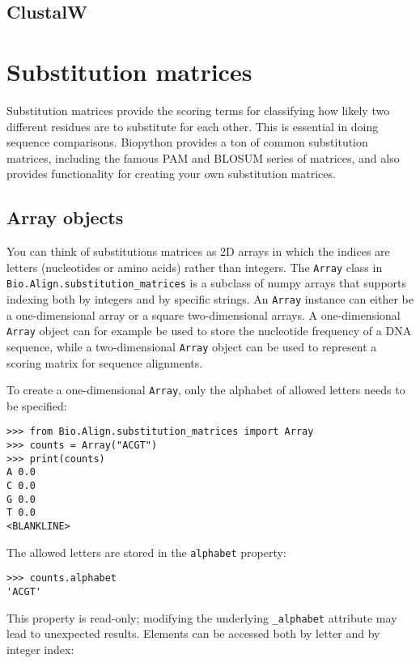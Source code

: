 \subsection{ClustalW}
\label{subsec:align_clustal}

\section{Substitution matrices}
\label{sec:substitution_matrices}

Substitution matrices \cite{durbin1998} provide the scoring terms for classifying how likely two different residues are to substitute for each other. This is essential in doing sequence comparisons.  Biopython provides a ton of common substitution matrices, including the famous PAM and BLOSUM series of matrices, and also provides functionality for creating your own substitution matrices.

\subsection{Array objects}

You can think of substitutions matrices as 2D arrays in which the indices are letters (nucleotides or amino acids) rather than integers.  The \verb+Array+ class in \verb+Bio.Align.substitution_matrices+ is a subclass of numpy arrays that supports indexing both by integers and by specific strings. An \verb+Array+ instance can either be a one-dimensional array or a square two-dimensional arrays. A one-dimensional \verb+Array+ object can for example be used to store the nucleotide frequency of a DNA sequence, while a two-dimensional \verb+Array+ object can be used to represent a scoring matrix for sequence alignments.

To create a one-dimensional \verb+Array+, only the alphabet of allowed letters needs to be specified:

\begin{verbatim}
>>> from Bio.Align.substitution_matrices import Array
>>> counts = Array("ACGT")
>>> print(counts)
A 0.0
C 0.0
G 0.0
T 0.0
<BLANKLINE>
\end{verbatim}
The allowed letters are stored in the \verb+alphabet+ property:

\begin{verbatim}
>>> counts.alphabet
'ACGT'
\end{verbatim}
This property is read-only; modifying the underlying \verb+_alphabet+ attribute may lead to unexpected results.
Elements can be accessed both by letter and by integer index:

